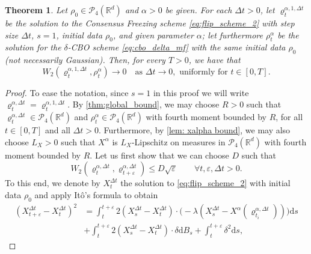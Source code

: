 \documentclass[reqno]{amsart}
\numberwithin{algorithm}{section}
\newcommand{\diff}{\mathrm{d}}
\newcommand{\R}{\mathbb{R}}
\newcommand{\Xalpha}{{X^\alpha}}
\newcommand{\mc}[1]{\mathcal{#1}}
\newtheorem{theorem}{Theorem}[section]
\begin{document}
{\begin{theorem}\label{thm:CFtodCBO}
    Let $\rho_0 \in \mc{P}_4(\R^d)$ and $\alpha > 0$ be given. For each $\Delta t > 0$, let $\varrho_{t}^{\alpha,1,\Delta t}$ be the solution to the Consensus Freezing scheme \eqref{eq:flip_scheme_2} with step size $\Delta t$, $s=1$, initial data $\rho_0$, and given parameter $\alpha$; let furthermore $\rho^\alpha_t$ be the solution for the $\delta$-CBO scheme \eqref{eq:cbo_delta_mf} with the same initial data $\rho_0$ (not necessarily Gaussian).
    Then, for every $T > 0$, we have that
    \begin{equation}
        W_2(\varrho_{t}^{\alpha,1,\Delta t}, \rho_t^\alpha) \to 0 \quad \text{as } \Delta t \to 0, \text{ uniformly for } t \in [0,T].
    \end{equation}
\end{theorem}
\begin{proof}
    To ease the notation, since $s=1$ in this proof we will write $\varrho_{t}^{\alpha,\Delta t}=\varrho_{t}^{\alpha,1,\Delta t}$.
    By \cref{thm:global_bound}, we may choose $R > 0$ such that $\varrho_{t}^{\alpha,\Delta t} \in \mc{P}_{4}(\R^d)$ and $\rho^\alpha_t \in \mc{P}_{4}(\R^d)$ with fourth moment bounded by $R$, for all $t \in [0,T]$ and all $\Delta t > 0$.
    Furthermore, by \cref{lem: xalpha bound}, we may also choose $L_X > 0$ such that $\Xalpha$ is $L_X$-Lipschitz on measures in $\mc{P}_{4}(\R^d)$ with fourth moment bounded by $R$.
    Let us first show that we can choose $D$ such that
    \begin{equation}
        W_2(\varrho_{t}^{\alpha,\Delta t}, \varrho_{t + \varepsilon}^{\alpha,\Delta t}) \leq D \sqrt{\varepsilon} \qquad \forall t, \varepsilon, \Delta t > 0.
    \end{equation}
    To this end, we denote by $X_t^{\Delta t}$ the solution to \eqref{eq:flip_scheme_2} with initial data $\rho_0$
    and apply It\^o's formula %
to     obtain
    \begin{equation*}
        \begin{split}
            (X_{t + \varepsilon}^{\Delta t} - X_t^{\Delta t})^2 &= \int_t^{t + \varepsilon} 2 (X_s^{\Delta t} - X_t^{\Delta t}) \cdot \big(-\lambda (X_s^{\Delta t} -\Xalpha(\varrho_{t_i}^{\alpha,\Delta t}))\big) \diff s \\ &+ \int_t^{t + \varepsilon} 2 (X_s^{\Delta t} - X_t^{\Delta t}) \cdot \delta \diff B_s + \int_t^{t + \varepsilon} \delta^2 \diff s,

\end{split}
\end{equation*}
\end{proof}}
\end{document}
